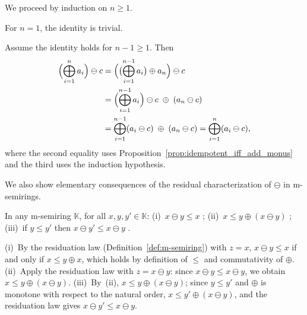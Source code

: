 \begin{appendixproof}
We proceed by induction on \(n \ge 1\).

For \(n=1\), the identity is trivial.

Assume the identity holds for \(n-1\geq 1\).
Then
\begin{align*}
\Bigl(\bigoplus_{i=1}^n a_i\Bigr)\ominus c
&= \Bigl(\bigl(\bigoplus_{i=1}^{n-1} a_i\bigr)\oplus a_n\Bigr)\ominus c \\
&= \Bigl(\bigoplus_{i=1}^{n-1} a_i\Bigr)\ominus c \;\oplus\; (a_n\ominus c) \\
&= \bigoplus_{i=1}^{n-1} (a_i\ominus c) \;\oplus\; (a_n\ominus c)
= \bigoplus_{i=1}^n (a_i\ominus c),
\end{align*}
where the second equality uses
Proposition~\ref{prop:idempotent_iff_add_monus} and the third uses the
induction hypothesis.
\end{appendixproof}

\noindent We also show elementary consequences of the residual
characterization of $\ominus$ in m-semirings.
\begin{lemmarep}\label{lem:monus-basic}
  In any m-semiring $\mathbb K$, for all $x,y,y'\in\mathbb K$:
  (i)~$x\ominus y \le x$ ;
  (ii)~$x \le y\oplus (x\ominus y)$ ;
  (iii)~if $y\le y'$ then $x\ominus y'\le x\ominus y$
  .
\end{lemmarep}

\begin{appendixproof}
  (i)~By the residuation law (Definition~\ref{def:m-semiring}) with
  $z=x$, $x\ominus y\le x$ if and only if $x\le y\oplus x$, which holds by
  definition of $\leq$ and commutativity of $\oplus$.
  (ii)~Apply the residuation law with $z=x\ominus y$: since
  $x\ominus y\le x\ominus y$, we obtain $x\le y\oplus(x\ominus y)$.
  (iii)~By~(ii), $x\le y\oplus(x\ominus y)$; since $y\le y'$ and $\oplus$
  is monotone with respect to the natural order,
  $x\le y'\oplus(x\ominus y)$, and the residuation law gives
  $x\ominus y'\le x\ominus y$.
\end{appendixproof}


